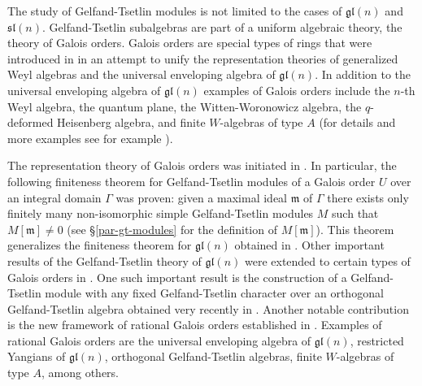 \documentclass[11pt,fleqn]{amsart}
\newcommand\m{\mathfrak m}
\newcommand\gl{\mathfrak{gl}}
\begin{document}
The study of Gelfand-Tsetlin modules is not limited to the cases of $\mathfrak{gl} (n)$ and $\mathfrak{sl} (n)$.  Gelfand-Tsetlin subalgebras are part of a uniform algebraic theory, the theory of Galois orders. Galois orders are special types of rings that were introduced in 
\cite{FO-galois-orders} in an attempt to unify the  representation theories of 
generalized Weyl algebras and the universal 
enveloping algebra of $\gl (n)$. In addition to 
the universal enveloping algebra of
$\gl (n)$ examples of Galois orders include  the $n$-th Weyl algebra,  the quantum plane,  the Witten-Wo\-ro\-no\-wicz algebra, the $q$-deformed Heisenberg algebra, and finite
$W$-algebras of type $A$ (for details and more examples see for example \cite{Hart-rational-galois}).

The representation theory of Galois orders was initiated in \cite{FO-fibers-gt}. In particular, the following finiteness theorem for Gelfand-Tsetlin modules of a Galois order $U$ over an integral domain $\Gamma$ was proven: given a maximal ideal $\m$ of $\Gamma$ there exists only finitely many non-isomorphic simple Gelfand-Tsetlin modules $M$ such that $M[\m] \neq 0$ (see \S \ref{par-gt-modules} for the definition of $M[\m]$). This theorem generalizes the finiteness theorem for $\gl (n)$ obtained in \cite{Ovs-finiteness}. Other important results of the Gelfand-Tsetlin theory of $\gl (n)$ were extended to  certain types of Galois orders in \cites{EMV-orthogonal, Hart-rational-galois, Maz-orthogonal-GT-alg}. One such important result is the construction of a Gelfand-Tsetlin module with any fixed Gelfand-Tsetlin character over an orthogonal Gelfand-Tsetlin algebra obtained very recently in \cite{EMV-orthogonal}. Another notable contribution is the new framework of rational Galois orders established in \cite{Hart-rational-galois}. Examples of rational Galois orders are the universal enveloping algebra of $\gl (n)$, restricted Yangians of $\gl (n)$, orthogonal Gelfand-Tsetlin algebras, finite $W$-algebras of type $A$, among  others.
\end{document}
